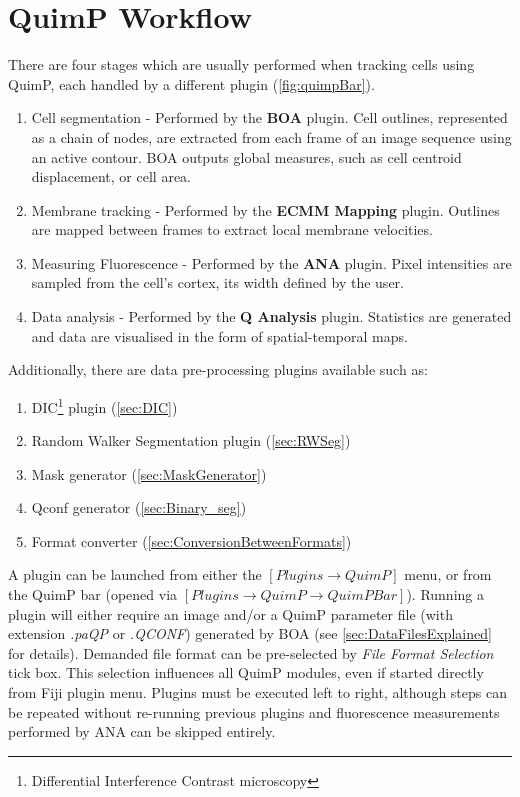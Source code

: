 \documentclass[a4paper,12pt]{article}
\begin{document}
\section{QuimP Workflow}

There are four stages which are usually performed when tracking cells using QuimP, each handled by a different plugin (\autoref{fig:quimpBar}).

\begin{enumerate}
	\item Cell segmentation - Performed by the \textbf{BOA} plugin.  Cell outlines, represented as a chain of nodes, are extracted from each frame of an image sequence using an active contour. BOA outputs global measures, such as cell centroid displacement, or cell area.
	\item Membrane tracking - Performed by the \textbf{ECMM Mapping} plugin.  Outlines are mapped between frames to extract local membrane velocities.
	\item Measuring Fluorescence - Performed by the \textbf{ANA} plugin.  Pixel intensities are sampled from the cell's cortex, its width defined by the user.
	\item Data analysis - Performed by the \textbf{Q Analysis} plugin. Statistics are generated and data are visualised in the form of spatial-temporal maps.
\end{enumerate}

Additionally, there are data pre-processing plugins available such as:

\begin{enumerate}
	\item DIC\footnote{Differential Interference Contrast microscopy} plugin (\autoref{sec:DIC})
	\item Random Walker Segmentation plugin (\autoref{sec:RWSeg})
	\item Mask generator (\autoref{sec:MaskGenerator})
	\item Qconf generator (\autoref{sec:Binary_seg})
	\item Format converter (\autoref{sec:ConversionBetweenFormats})
\end{enumerate}

A plugin can be launched from either the $[Plugins\rightarrow QuimP]$ menu, or from the QuimP bar
(opened via $[Plugins\rightarrow QuimP\rightarrow QuimP Bar]$).
Running a plugin will either require an image and/or a QuimP parameter file (with extension \textit{.paQP} or  \textit{.QCONF}) generated by BOA (see \autoref{sec:DataFilesExplained} for details). Demanded file format can be pre-selected by \textit{File Format Selection} tick box. This selection influences all QuimP modules, even if started directly from Fiji plugin menu.
Plugins must be executed left to right, although steps can be repeated without re-running previous plugins and fluorescence measurements performed by ANA can be skipped entirely.
\end{document}
